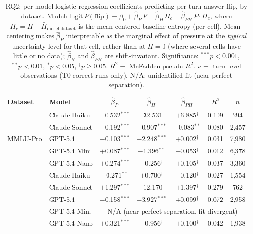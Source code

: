 \begin{table}[t]
\centering
\caption{RQ2: per-model logistic regression coefficients predicting
  per-turn answer flip, by dataset. Model:
  $\mathrm{logit}\,P(\mathrm{flip}) = \beta_0 + \hat\beta_P\,P +
   \hat\beta_H\,H_c + \hat\beta_{PH}\,P\!\cdot\!H_c$,
  where $H_c = H - \bar{H}_{\text{model,dataset}}$ is the
  mean-centered baseline entropy (per cell). Mean-centering makes
  $\hat\beta_P$ interpretable as the marginal effect of pressure at
  the \emph{typical} uncertainty level for that cell, rather than at
  $H = 0$ (where several cells have little or no data);
  $\hat\beta_H$ and $\hat\beta_{PH}$ are shift-invariant.
  Significance: $^{***}p{<}0.001$, $^{**}p{<}0.01$, $^{*}p{<}0.05$,
  $^\dagger p{\geq}0.05$. $R^2 =$ McFadden pseudo-$R^2$.
  $n =$ turn-level observations (T0-correct runs only).
  N/A: unidentified fit (near-perfect separation).}
\label{tab:rq2}
\small\setlength{\tabcolsep}{3pt}
\begin{tabular}{ll ccccc}
\toprule
\textbf{Dataset} & \textbf{Model} & $\hat\beta_P$ & $\hat\beta_H$ & $\hat\beta_{PH}$ & $R^2$ & $n$ \\
\midrule
\multirow{5}{*}{MMLU-Pro}
  & Claude Haiku  & $-$0.532$^{***}$ & $-$32.531$^\dagger$ & $+$6.885$^\dagger$  & 0.109 & 294 \\
  & Claude Sonnet & $-$0.192$^{***}$ & $-$0.907$^{***}$    & $+$0.083$^{**}$     & 0.080 & 2{,}457 \\
  & GPT-5.4       & $-$0.103$^{***}$ & $-$2.248$^{***}$    & $+$0.002$^\dagger$  & 0.031 & 7{,}980 \\
  & GPT-5.4 Mini  & $+$0.087$^{***}$ & $-$1.396$^{**}$     & $-$0.053$^\dagger$  & 0.012 & 6{,}378 \\
  & GPT-5.4 Nano  & $+$0.274$^{***}$ & $-$0.256$^\dagger$  & $+$0.105$^\dagger$  & 0.037 & 3{,}360 \\
\addlinespace
\multirow{5}{*}{GPQA-Diam.}
  & Claude Haiku  & $-$0.271$^{**}$  & $+$0.700$^\dagger$  & $-$0.120$^\dagger$  & 0.027 & 1{,}554 \\
  & Claude Sonnet & $+$1.297$^{***}$ & $-$12.170$^\dagger$ & $+$1.397$^\dagger$  & 0.279 & 762 \\
  & GPT-5.4       & $-$0.158$^{***}$ & $-$3.927$^{***}$    & $+$0.099$^\dagger$  & 0.072 & 2{,}958 \\
  & GPT-5.4 Mini  & \multicolumn{5}{c}{N/A (near-perfect separation, fit divergent)} \\
  & GPT-5.4 Nano  & $+$0.321$^{***}$ & $-$0.956$^\dagger$  & $+$0.100$^\dagger$  & 0.042 & 1{,}938 \\
\bottomrule
\end{tabular}
\end{table}
